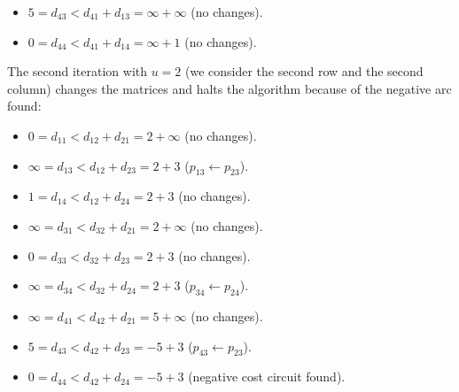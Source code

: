 \documentclass[12pt, a4paper]{report}
\newtheorem[style=M,bodystyle=\normalfont]{proposition}{Proposition}
\newtheorem[style=M,bodystyle=\normalfont]{theorem}{Theorem}
\newtheorem[style=M,bodystyle=\normalfont]{corollary}{Corollary}
\newtheorem[style=M,bodystyle=\normalfont]{lemma}{Lemma}
\newtheorem[style=M,bodystyle=\normalfont]{definition}{Definition}
\begin{document}
\begin{example}
\begin{itemize}
            \item $5=d_{43} < d_{41} + d_{13} = \infty + \infty$ (no changes). 
            \item $0=d_{44} < d_{41} + d_{14} = \infty + 1$ (no changes). 
        \end{itemize}
        The second iteration with $u=2$ (we consider the second row and the second column) changes the matrices and halts the algorithm because of the negative arc found: 
        \begin{itemize}
            \item $0=d_{11} < d_{12} + d_{21} = 2 +\infty $ (no changes). 
            \item $\infty=d_{13} < d_{12} + d_{23} = 2+3$ ($p_{13} \leftarrow p_{23}$). 
            \item $1=d_{14} < d_{12} + d_{24} = 2+3$ (no changes). 
            \item $\infty=d_{31} < d_{32} + d_{21} = 2 + \infty$ (no changes). 
            \item $0=d_{33} < d_{32} + d_{23} = 2+3$ (no changes). 
            \item $\infty=d_{34} < d_{32} + d_{24} = 2+3$ ($p_{34} \leftarrow p_{24}$). 
            \item $\infty=d_{41} < d_{42} + d_{21} = 5 + \infty$ (no changes). 
            \item $5=d_{43} < d_{42} + d_{23} = -5+3$ ($p_{43} \leftarrow p_{23}$). 
            \item $0=d_{44} < d_{42} + d_{24} = -5+3$ (negative cost circuit found). 
        \end{itemize}
    \end{example}
\end{document}

